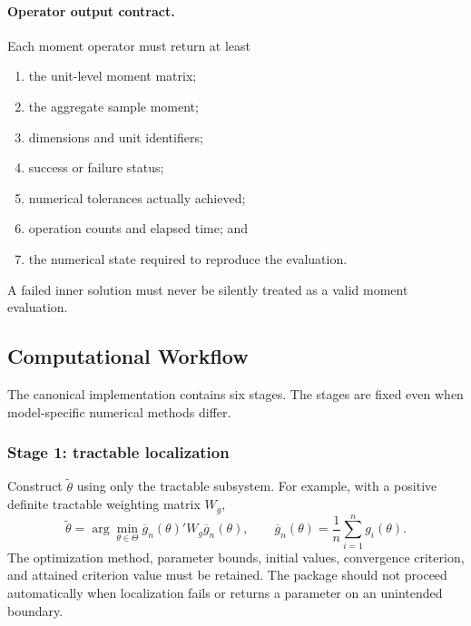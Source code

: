 \paragraph{Operator output contract.}
Each moment operator must return at least
\begin{enumerate}
 \item the unit-level moment matrix;
 \item the aggregate sample moment;
 \item dimensions and unit identifiers;
 \item success or failure status;
 \item numerical tolerances actually achieved;
 \item operation counts and elapsed time; and
 \item the numerical state required to reproduce the evaluation.
\end{enumerate}
A failed inner solution must never be silently treated as a valid moment
evaluation.

\subsection{Computational Workflow}
\label{app:computational_workflow}

The canonical implementation contains six stages. The stages are fixed even
when model-specific numerical methods differ.

\subsubsection{Stage 1: tractable localization}

Construct $\widetilde\theta$ using only the tractable subsystem. For example,
with a positive definite tractable weighting matrix $W_g$,
\begin{equation}
 \widetilde\theta
 =
 \arg\min_{\theta\in\Theta}
 \overline g_n(\theta)'W_g\overline g_n(\theta),
 \qquad
 \overline g_n(\theta)
 =
 \frac{1}{n}\sum_{i=1}^n g_i(\theta).
 \label{eq:app_localizer}
\end{equation}
The optimization method, parameter bounds, initial values, convergence
criterion, and attained criterion value must be retained. The package should
not proceed automatically when localization fails or returns a parameter on an
unintended boundary.

